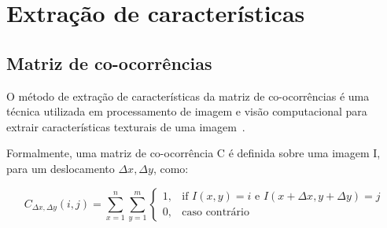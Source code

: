 \begin{figure}[t]
        \captionsetup{width=12cm}
		\centering
\end{figure}
\FloatBarrier{}

\section{Extração de características}\label{sec:extracao-caracteristicas}

\subsection{Matriz de co-ocorrências}\label{sec:teorica-matriz-co-ocorrencia}

O método de extração de características da matriz de co-ocorrências é
uma técnica utilizada em processamento de imagem e visão computacional
para extrair características texturais de uma imagem~\cite{matrizcoocorrencia2017}.

Formalmente, uma matriz de co-ocorrência C é definida sobre uma imagem
I, para um deslocamento $\Delta x, \Delta y$, como:

\begin{equation}\label{eq:comatrix}
  C_{\Delta x, \Delta y}(i,j) = \sum_{x=1}^n\sum_{y=1}^m
  \begin{cases} 1, & \text{if }I(x,y)=i\text{ e }I(x+\Delta x, y+\Delta y)=j
               \\ 0, & \text{caso contrário}
  \end{cases}
\end{equation}


